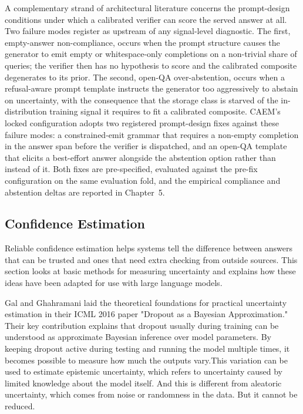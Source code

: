 A complementary strand of architectural literature concerns the prompt-design conditions under which a calibrated verifier can score the served answer at all. Two failure modes register as upstream of any signal-level diagnostic. The first, empty-answer non-compliance, occurs when the prompt structure causes the generator to emit empty or whitespace-only completions on a non-trivial share of queries; the verifier then has no hypothesis to score and the calibrated composite degenerates to its prior. The second, open-QA over-abstention, occurs when a refusal-aware prompt template instructs the generator too aggressively to abstain on uncertainty, with the consequence that the storage class is starved of the in-distribution training signal it requires to fit a calibrated composite. CAEM's locked configuration adopts two registered prompt-design fixes against these failure modes: a constrained-emit grammar that requires a non-empty completion in the answer span before the verifier is dispatched, and an open-QA template that elicits a best-effort answer alongside the abstention option rather than instead of it. Both fixes are pre-specified, evaluated against the pre-fix configuration on the same evaluation fold, and the empirical compliance and abstention deltas are reported in Chapter~5.

\subsection{Confidence Estimation}

Reliable confidence estimation helps systems tell the difference between answers that can be trusted and ones that need extra checking from outside sources. This section looks at basic methods for measuring uncertainty and explains how these ideas have been adapted for use with large language models.

Gal and Ghahramani \cite{pmlr-v48-gal16} laid the theoretical foundations for practical uncertainty estimation in their ICML 2016 paper "Dropout as a Bayesian Approximation." Their key contribution explains that dropout usually during training can be understood as approximate Bayesian inference over model parameters. By keeping dropout active during testing and running the model multiple times, it becomes possible to measure how much the outputs vary.This variation can be used to estimate epistemic uncertainty, which refers to uncertainty caused by limited knowledge about the model itself. And this is different from aleatoric uncertainty, which comes from noise or randomness in the data. But it cannot be reduced.

